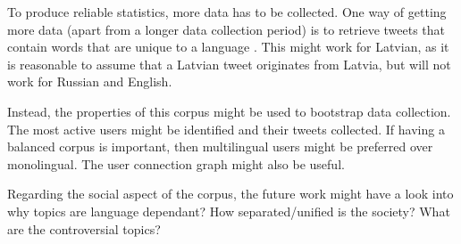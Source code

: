 \documentclass[11pt,a4paper]{article}
\begin{document}
To produce reliable statistics, more data has to be collected. One way of getting more data (apart from a longer data collection period) is to retrieve tweets that contain words that are unique to a language \cite{sang2013}. This might work for Latvian, as it is reasonable to assume that a Latvian tweet originates from Latvia, but will not work for Russian and English.

Instead, the properties of this corpus might be used to bootstrap data collection. The most active users might be identified and their tweets collected. If having a balanced corpus is important, then multilingual users might be preferred over monolingual. The user connection graph might also be useful.

Regarding the social aspect of the corpus, the future work might have a look into why topics are language dependant? How separated/unified is the society? What are the controversial topics?



\end{document}
